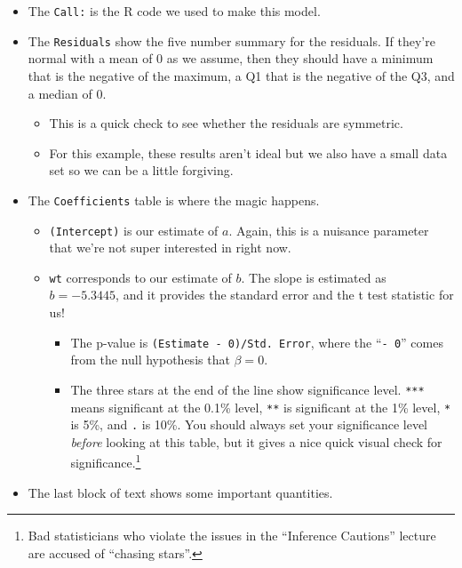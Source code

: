 \documentclass[
  letterpaper,
  DIV=11,
  numbers=noendperiod,
  oneside]{scrreprt}
\providecommand{\tightlist}{%
  \setlength{\itemsep}{0pt}\setlength{\parskip}{0pt}}\usepackage{longtable,booktabs,array}
\begin{document}
\begin{itemize}
\tightlist
\item
  The \texttt{Call:} is the R code we used to make this model.
\item
  The \texttt{Residuals} show the five number summary for the residuals.
  If they're normal with a mean of 0 as we assume, then they should have
  a minimum that is the negative of the maximum, a Q1 that is the
  negative of the Q3, and a median of 0.

  \begin{itemize}
  \tightlist
  \item
    This is a quick check to see whether the residuals are symmetric.
  \item
    For this example, these results aren't ideal but we also have a
    small data set so we can be a little forgiving.
  \end{itemize}
\item
  The \texttt{Coefficients} table is where the magic happens.

  \begin{itemize}
  \tightlist
  \item
    \texttt{(Intercept)} is our estimate of \(a\). Again, this is a
    nuisance parameter that we're not super interested in right now.
  \item
    \texttt{wt} corresponds to our estimate of \(b\). The slope is
    estimated as \(b=-5.3445\), and it provides the standard error and
    the t test statistic for us!

    \begin{itemize}
    \tightlist
    \item
      The p-value is \texttt{(Estimate\ -\ 0)/Std.\ Error}, where the
      ``\texttt{-\ 0}'' comes from the null hypothesis that
      \(\beta = 0\).
    \item
      The three stars at the end of the line show significance level.
      \texttt{***} means significant at the 0.1\% level, \texttt{**} is
      significant at the 1\% level, \texttt{*} is 5\%, and \texttt{.} is
      10\%. You should always set your significance level \emph{before}
      looking at this table, but it gives a nice quick visual check for
      significance.\footnote{Bad statisticians who violate the issues in
        the ``Inference Cautions'' lecture are accused of ``chasing
        stars''.}
    \end{itemize}
  \end{itemize}
\item
  The last block of text shows some important quantities.


\end{itemize}
\end{document}
